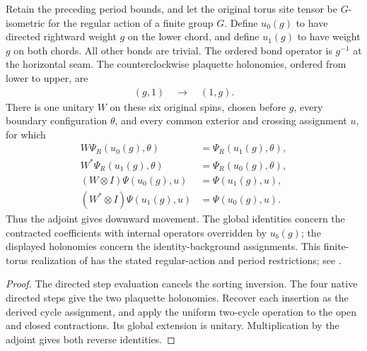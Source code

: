 \begin{lemma}
    \label{thm:peps_torus_vertical_flux_move}
    \leanok
    Retain the preceding period bounds, and let the original torus site tensor
    be $G$-isometric for the regular action of a finite group $G$. Define $u_0(g)$
    to have directed rightward weight $g$ on the lower chord, and define
    $u_1(g)$ to have weight $g$ on both chords. All other bonds are trivial.
    The ordered bond operator is $g^{-1}$ at the horizontal seam. The
    counterclockwise plaquette holonomies, ordered from lower to upper, are
    \begin{align}
        (g,1)\quad\longrightarrow\quad(1,g).
    \end{align}
    There is one unitary $W$ on these six original spins, chosen before $g$,
    every boundary configuration $\theta$, and every common exterior and crossing
    assignment $u$, for which
    \begin{align}
        W\Psi_R(u_0(g),\theta)       & =\Psi_R(u_1(g),\theta), \\
        W^*\Psi_R(u_1(g),\theta)     & =\Psi_R(u_0(g),\theta), \\
        (W\otimes I)\Psi(u_0(g),u)   & =\Psi(u_1(g),u),        \\
        (W^*\otimes I)\Psi(u_1(g),u) & =\Psi(u_0(g),u).
    \end{align}
    Thus the adjoint gives downward movement. The global identities concern the
    contracted coefficients with internal operators overridden by
    $u_b(g)$; the displayed holonomies concern the identity-background
    assignments. This finite-torus realization of
    \cite[Theorem~6.16]{Schuch2010PEPS} has the stated regular-action and period
    restrictions; see \cite{gap:rmp_peps_quantum_double_g_isometry}.
\end{lemma}

\begin{proof}\leanok
    The directed step evaluation cancels the sorting inversion. The four native directed
    steps give the two plaquette holonomies. Recover each insertion as
    the derived cycle assignment, and apply the uniform two-cycle operation to
    the open and closed contractions. Its global extension is unitary.
    Multiplication by the adjoint gives both reverse identities.
\end{proof}
